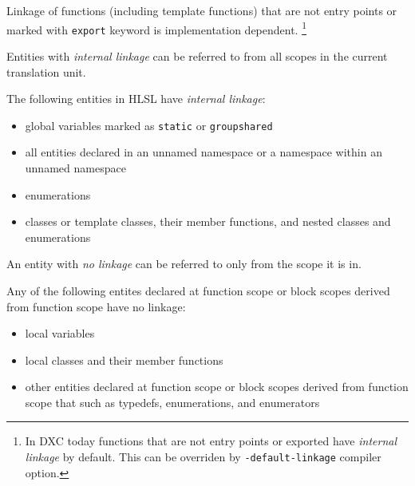 \p Linkage of functions (including template functions) that are not entry points or marked with \texttt{export} keyword is implementation dependent. \footnote{In DXC today functions that are not entry points or exported have \textit{internal linkage} by default. This can be overriden by \texttt{-default-linkage} compiler option.}


\p Entities with \textit{internal linkage} can be referred to from all scopes in the current translation unit.

\p The following entities in HLSL have \textit{internal linkage}:
\begin{itemize}
  \item global variables marked as \texttt{static} or \texttt{groupshared}
  \item all entities declared in an unnamed namespace or a namespace within an unnamed namespace
  \item enumerations
  \item classes or template classes, their member functions, and nested classes and enumerations
\end{itemize}


\p An entity with \textit{no linkage} can be referred to only from the scope it is in.

\p Any of the following entites declared at function scope or block scopes derived from function scope have no linkage:
\begin{itemize}
  \item local variables
  \item local classes and their member functions
  \item other entities declared at function scope or block scopes derived from function scope that such as typedefs, enumerations, and enumerators
\end{itemize}
